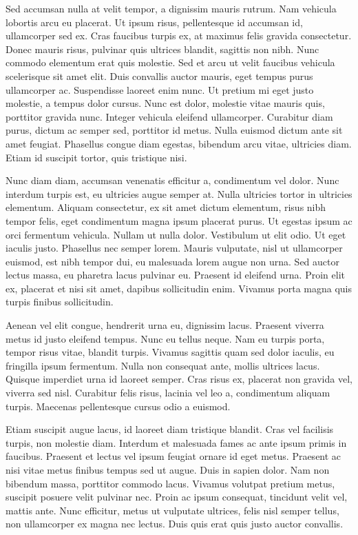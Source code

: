 \documentclass[12pt, letterpaper,twocolumn]{article}
\begin{document}
Sed accumsan nulla at velit tempor, a dignissim mauris rutrum. Nam vehicula lobortis arcu eu placerat. Ut ipsum risus, pellentesque id accumsan id, ullamcorper sed ex. Cras faucibus turpis ex, at maximus felis gravida consectetur. Donec mauris risus, pulvinar quis ultrices blandit, sagittis non nibh. Nunc commodo elementum erat quis molestie. Sed et arcu ut velit faucibus vehicula scelerisque sit amet elit. Duis convallis auctor mauris, eget tempus purus ullamcorper ac. Suspendisse laoreet enim nunc. Ut pretium mi eget justo molestie, a tempus dolor cursus. Nunc est dolor, molestie vitae mauris quis, porttitor gravida nunc. Integer vehicula eleifend ullamcorper. Curabitur diam purus, dictum ac semper sed, porttitor id metus. Nulla euismod dictum ante sit amet feugiat. Phasellus congue diam egestas, bibendum arcu vitae, ultricies diam. Etiam id suscipit tortor, quis tristique nisi.

Nunc diam diam, accumsan venenatis efficitur a, condimentum vel dolor. Nunc interdum turpis est, eu ultricies augue semper at. Nulla ultricies tortor in ultricies elementum. Aliquam consectetur, ex sit amet dictum elementum, risus nibh tempor felis, eget condimentum magna ipsum placerat purus. Ut egestas ipsum ac orci fermentum vehicula. Nullam ut nulla dolor. Vestibulum ut elit odio. Ut eget iaculis justo. Phasellus nec semper lorem. Mauris vulputate, nisl ut ullamcorper euismod, est nibh tempor dui, eu malesuada lorem augue non urna. Sed auctor lectus massa, eu pharetra lacus pulvinar eu. Praesent id eleifend urna. Proin elit ex, placerat et nisi sit amet, dapibus sollicitudin enim. Vivamus porta magna quis turpis finibus sollicitudin.

Aenean vel elit congue, hendrerit urna eu, dignissim lacus. Praesent viverra metus id justo eleifend tempus. Nunc eu tellus neque. Nam eu turpis porta, tempor risus vitae, blandit turpis. Vivamus sagittis quam sed dolor iaculis, eu fringilla ipsum fermentum. Nulla non consequat ante, mollis ultrices lacus. Quisque imperdiet urna id laoreet semper. Cras risus ex, placerat non gravida vel, viverra sed nisl. Curabitur felis risus, lacinia vel leo a, condimentum aliquam turpis. Maecenas pellentesque cursus odio a euismod.

Etiam suscipit augue lacus, id laoreet diam tristique blandit. Cras vel facilisis turpis, non molestie diam. Interdum et malesuada fames ac ante ipsum primis in faucibus. Praesent et lectus vel ipsum feugiat ornare id eget metus. Praesent ac nisi vitae metus finibus tempus sed ut augue. Duis in sapien dolor. Nam non bibendum massa, porttitor commodo lacus. Vivamus volutpat pretium metus, suscipit posuere velit pulvinar nec. Proin ac ipsum consequat, tincidunt velit vel, mattis ante. Nunc efficitur, metus ut vulputate ultrices, felis nisl semper tellus, non ullamcorper ex magna nec lectus. Duis quis erat quis justo auctor convallis.
\end{document}
